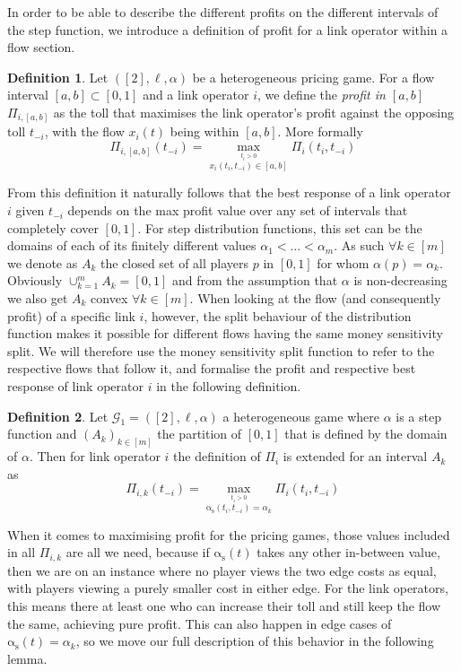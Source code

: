 \documentclass[10pt,a4paper]{book}
\newcommand{\as}{\mathrm{\alpha_s}}
\newcommand{\Gm}{\mathcal{G}}
\DeclareMathOperator*{\argmax}{arg\,max}
\theoremstyle{definition}
\newtheorem{definition}{Definition}[chapter]
\theoremstyle{comment}
\begin{document}
In order to be able to describe the different profits on the different intervals of the step function, we introduce a definition of profit for a link operator within a flow section.

\begin{definition}
	\label{definition:profit_interval}
	Let $([2], \ell, \alpha)$ be a heterogeneous pricing game.
	For a flow interval $[a, b] \subset [0, 1]$ and a link operator $i$, we define the \textit{profit in $[a, b]$} $\Pi_{i, [a, b]}$ as the toll that maximises the link operator's profit against the opposing toll $t_{-i}$, with the flow $x_i(t)$ being within $[a, b]$.
	More formally
	\[
		\Pi_{i, [a, b]}(t_{-i}) = \max_{\stackrel{t_i > 0}{x_i(t_i, t_{-i}) \in [a, b]}}\Pi_i(t_i, t_{-i})
	\]
\end{definition}

From this definition it naturally follows that the best response of a link operator $i$ given $t_{-i}$ depends on the max profit value over any set of intervals that completely cover $[0, 1]$.
For step distribution functions, this set can be the domains of each of its finitely different values $\alpha_1 < \ldots < \alpha_m$.
As such $\forall k \in [m]$ we denote as $A_k$ the closed set of all players $p$ in $[0, 1]$ for whom $\alpha(p) = \alpha_k$.
Obviously $\cup_{k=1}^m A_k = [0, 1]$ and from the assumption that $\alpha$ is non-decreasing we also get $A_k$ convex $\forall k \in [m]$.
When looking at the flow (and consequently profit) of a specific link $i$, however, the split behaviour of the distribution function makes it possible for different flows having the same money sensitivity split.
We will therefore use the money sensitivity split function to refer to the respective flows that follow it, and formalise the profit and respective best response of link operator $i$ in the following definition.

\begin{definition}
	Let $\Gm_1 = ([2], \ell, \alpha)$ a heterogeneous game where $\alpha$ is a step function and $(A_k)_{k \in [m]}$ the partition of $[0, 1]$ that is defined by the domain of $\alpha$.
	Then for link operator $i$ the definition of $\Pi_i$ is extended for an interval $A_k$ as
	\[
		\Pi_{i, k}(t_{-i}) = \max_{\stackrel{t_i > 0}{\as(t_i, t_{-i}) = \alpha_k}}\Pi_i(t_i, t_{-i})
	\]
\end{definition}

When it comes to maximising profit for the pricing games, those values included in all $\Pi_{i, k}$ are all we need, because if $\as(t)$ takes any other in-between value, then we are on an instance where no player views the two edge costs as equal, with players viewing a purely smaller cost in either edge.
For the link operators, this means there at least one who can increase their toll and still keep the flow the same, achieving pure profit.
This can also happen in edge cases of $\as(t) = \alpha_k$, so we move our full description of this behavior in the following lemma.
\end{document}
